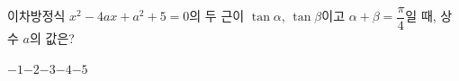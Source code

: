 이차방정식 $x^2-4ax+a^2+5=0$의 두 근이 $\tan\alpha$, $\tan\beta$이고 $\alpha+\beta=\dfrac{\pi}{4}$일 때, 상수 $a$의 값은?
\begin{choices32}{$-1$}{$-2$}{$-3$}{$-4$}{$-5$}\end{choices32}
